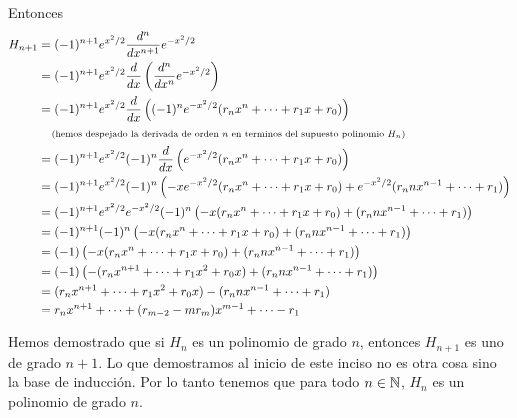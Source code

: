 Entonces
\scriptsize
\begin{align}
    H_{n+1} &=  (-1)^{n+1}  e^{x^2/2}   \frac{d^n}{dx^{n+1}}e^{-x^2/2}                                                                              \\
            &=  (-1)^{n+1}  e^{x^2/2}   \frac{d}{dx}\left(\frac{d^n}{dx^{n}}e^{-x^2/2}\right)                                                       \\
            &=  (-1)^{n+1}  e^{x^2/2}   \frac{d}{dx}\left((-1)^n e^{-x^2/2}(r_n x^n + \dots + r_1 x + r_0)\right)                                   \\
            &\;\;\;\;\mbox{{\scriptsize(hemos despejado la derivada de orden $n$ en terminos del supuesto polinomio $H_n$)}}                                            \\
            &=  (-1)^{n+1}  e^{x^2/2} (-1)^n \frac{d}{dx}\left(e^{-x^2/2}(r_n x^n + \dots + r_1 x + r_0)\right)                                     \\
            &=  (-1)^{n+1}  e^{x^2/2} (-1)^n \left(-x e^{-x^2/2}(r_n x^n + \dots + r_1 x + r_0) + e^{-x^2/2}(r_n n x^{n-1} + \dots + r_1)\right)    \\
            &=  (-1)^{n+1}  e^{x^2/2} e^{-x^2/2} (-1)^n \left(-x (r_n x^n + \dots + r_1 x + r_0) + (r_n n x^{n-1} + \dots + r_1)\right)             \\
            &=  (-1)^{n+1} (-1)^n \left(-x (r_n x^n + \dots + r_1 x + r_0) + (r_n n x^{n-1} + \dots + r_1)\right)                                   \\
            &=  (-1) \left(-x (r_n x^n + \dots + r_1 x + r_0) + (r_n n x^{n-1} + \dots + r_1)\right)                                                \\
            &=  (-1) \left(-(r_n x^{n+1} + \dots + r_1 x^2 + r_0 x) + (r_n n x^{n-1} + \dots + r_1)\right)                                          \\
            &=  (r_n x^{n+1} + \dots + r_1 x^2 + r_0 x) - (r_n n x^{n-1} + \dots + r_1)                                                             \\
            &=  r_n x^{n+1} + \dots + (r_{m-2} - m r_m) x^{m-1} + \dots - r_1                                                                       \\
\end{align}
\normalsize

Hemos demostrado que si $H_n$ es un polinomio de grado $n$, entonces $H_{n+1}$ es 
uno de grado $n+1$. Lo que demostramos al inicio de este inciso no es otra 
cosa sino la base de inducción. Por lo tanto tenemos que para todo $n \in \mathbb{N}$, 
$H_n$ es un polinomio de grado $n$.\pn

